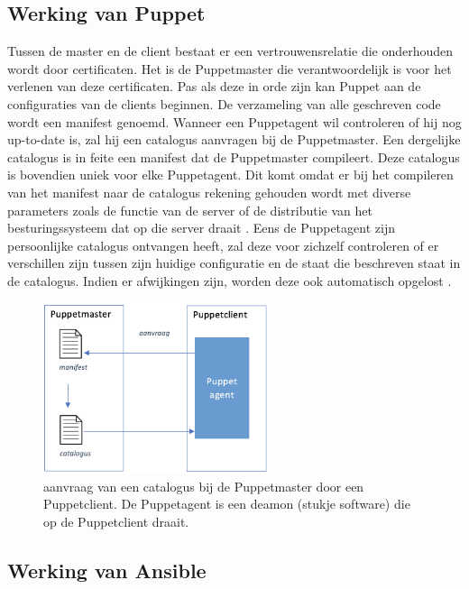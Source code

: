 \subsection{Werking van Puppet}

Tussen de master en de client bestaat er een vertrouwensrelatie die onderhouden wordt door certificaten. Het is de Puppetmaster die verantwoordelijk is voor het verlenen van deze certificaten. Pas als deze in orde zijn kan Puppet  aan de configuraties van de clients beginnen. De verzameling van alle geschreven code wordt een manifest genoemd. Wanneer een Puppetagent wil controleren of hij nog up-to-date is, zal hij een catalogus aanvragen bij de Puppetmaster. Een dergelijke catalogus is in feite een manifest dat de Puppetmaster compileert. Deze catalogus is bovendien uniek voor elke Puppetagent. Dit komt omdat er bij het compileren van het manifest naar de catalogus rekening gehouden wordt met diverse parameters zoals de functie van de server of de distributie van het besturingssysteem dat op die server draait \autocite{Puppetlanguagecatalog}. Eens de Puppetagent zijn persoonlijke catalogus ontvangen heeft, zal deze voor zichzelf controleren of er verschillen zijn tussen zijn huidige configuratie en de staat die beschreven staat in de catalogus. Indien er afwijkingen zijn, worden deze ook automatisch opgelost \autocite{puppetdoc}.

\begin{figure}  \begin{center}
  \includegraphics[width=250px]{img/aanvraagCatalogus.png}
 \end{center}\caption{aanvraag van een catalogus bij de Puppetmaster door een Puppetclient. De Puppetagent is een deamon (stukje software) die op de Puppetclient draait.}  
  \label{fig:aanvraagCatalogus}
\end{figure}


\subsection{Werking van Ansible}

